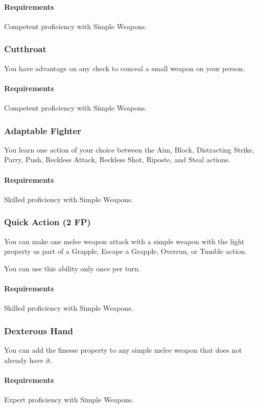     \paragraph{Requirements} Competent proficiency with Simple Weapons.
\subsubsection{Cutthroat} \label{feat::cutthroat}
    You have advantage on any check to conceal a small weapon on your person.
    \paragraph{Requirements} Competent proficiency with Simple Weapons.
\subsubsection{Adaptable Fighter} \label{feat::adaptablefighter}
    You learn one action of your choice between the Aim, Block, Distracting Strike, Parry, Push, Reckless Attack, Reckless Shot, Riposte, and Steal actions.
    \paragraph{Requirements} Skilled proficiency with Simple Weapons.
\subsubsection{Quick Action (2 FP)} \label{feat::quickaction}
    You can make one melee weapon attack with a simple weapon with the light property as part of a Grapple, Escape a Grapple, Overrun, or Tumble action.

    You can use this ability only once per turn.
    \paragraph{Requirements} Skilled proficiency with Simple Weapons.
\subsubsection{Dexterous Hand} \label{feat::dexteroushand}
    You can add the finesse property to any simple melee weapon that does not already have it.
    \paragraph{Requirements} Expert proficiency with Simple Weapons.
